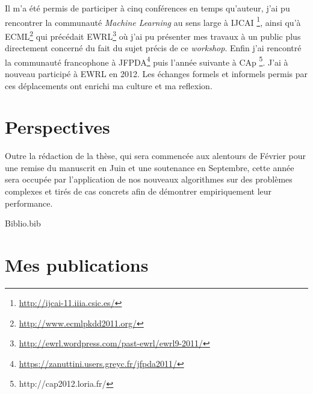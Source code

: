 \documentclass[11pt]{article}
\begin{document}
  Il m'a été permis de participer à cinq conférences en temps qu'auteur, j'ai pu rencontrer la communauté \emph{Machine Learning} au sens large à IJCAI \footnote{\href{http://ijcai-11.iiia.csic.es/}{http://ijcai-11.iiia.csic.es/}
 }, ainsi qu'à ECML\footnote{\href{http://www.ecmlpkdd2011.org/}{http://www.ecmlpkdd2011.org/}
 } qui précédait EWRL\footnote{\href{http://ewrl.wordpress.com/past-ewrl/ewrl9-2011/}{http://ewrl.wordpress.com/past-ewrl/ewrl9-2011/}
 } où j'ai pu présenter mes travaux à un public plus directement concerné du fait du sujet précis de ce \emph{workshop}. Enfin j'ai rencontré la communauté francophone à JFPDA\footnote{\href{https://zanuttini.users.greyc.fr/jfpda2011/}{https://zanuttini.users.greyc.fr/jfpda2011/}} puis l'année suivante à CAp \footnote{http://cap2012.loria.fr/}. J'ai à nouveau participé à EWRL en 2012. Les échanges formels et informels permis par ces déplacements ont enrichi ma culture et ma reflexion.

  
\section{Perspectives}
\label{sec-4}

Outre la rédaction de la thèse, qui sera commencée aux alentours de Février pour une remise du manuscrit en Juin et une soutenance en Septembre, cette année sera occupée par l'application de nos nouveaux algorithmes sur des problèmes complexes et tirés de cas concrets afin de démontrer empiriquement leur performance.
  
 \begin{btSect}[alpha]{Biblio.bib}
 \section{Mes publications}
 \nocite{klein2011dimensionality,klein2011batch,klein2011batch2,klein2011batch3,klein2012,Supelec773}
 \btPrintCited
 \end{btSect}
\end{document}
